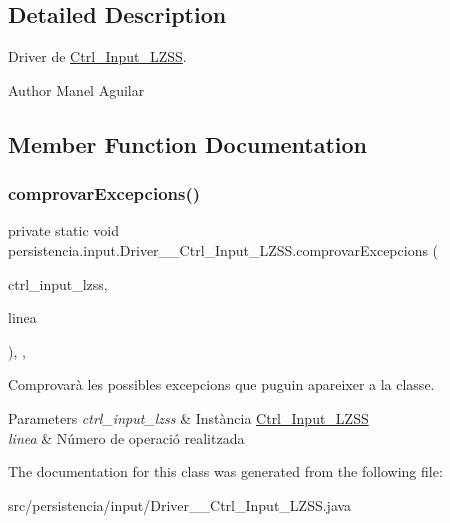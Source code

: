 \subsection{Detailed Description}
Driver de \hyperlink{classpersistencia_1_1input_1_1Ctrl__Input__LZSS}{Ctrl\+\_\+\+Input\+\_\+\+L\+Z\+SS}. 

\begin{DoxyAuthor}{Author}
Manel Aguilar 
\end{DoxyAuthor}


\subsection{Member Function Documentation}
\mbox{\label{classpersistencia_1_1input_1_1Driver____Ctrl__Input__LZSS_a221f978664fc97bdab3b18d3c5f55155}} 
\subsubsection{\texorpdfstring{comprovar\+Excepcions()}{comprovarExcepcions()}}
{\footnotesize\ttfamily private static void persistencia.\+input.\+Driver\+\_\+\+\_\+\+Ctrl\+\_\+\+Input\+\_\+\+L\+Z\+S\+S.\+comprovar\+Excepcions (\begin{DoxyParamCaption}\item[{\hyperlink{classpersistencia_1_1input_1_1Ctrl__Input__LZSS}{Ctrl\+\_\+\+Input\+\_\+\+L\+Z\+SS}}]{ctrl\+\_\+input\+\_\+lzss,  }\item[{String}]{linea }\end{DoxyParamCaption})\hspace{0.3cm}{\ttfamily [inline]}, {\ttfamily [static]}, {\ttfamily [private]}}



Comprovarà les possibles excepcions que puguin apareixer a la classe. 


\begin{DoxyParams}{Parameters}
{\em ctrl\+\_\+input\+\_\+lzss} & Instància \hyperlink{classpersistencia_1_1input_1_1Ctrl__Input__LZSS}{Ctrl\+\_\+\+Input\+\_\+\+L\+Z\+SS} \\
\hline
{\em linea} & Número de operació realitzada \\
\hline
\end{DoxyParams}


The documentation for this class was generated from the following file\+:\begin{DoxyCompactItemize}
\item 
src/persistencia/input/Driver\+\_\+\+\_\+\+Ctrl\+\_\+\+Input\+\_\+\+L\+Z\+S\+S.\+java\end{DoxyCompactItemize}
